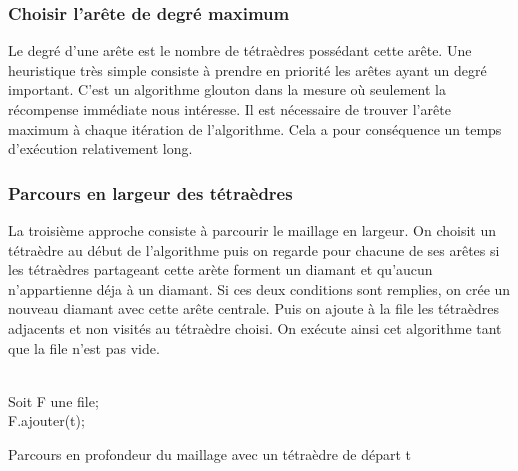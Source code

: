 \documentclass[a4paper,11pt,openany]{article}
\begin{document}
\subsubsection{Choisir l'arête de degré maximum}
\noindent
Le degré d'une arête est le nombre de tétraèdres possédant cette arête. Une heuristique très simple consiste à prendre en priorité les arêtes ayant un degré important. C'est un algorithme glouton dans la mesure où seulement la récompense immédiate nous intéresse. Il est nécessaire de trouver l'arête maximum à chaque itération de l'algorithme. Cela a pour conséquence un temps d'exécution relativement long.
\subsubsection{Parcours en largeur des tétraèdres}
\label{parcours_largeur}
\noindent
La troisième approche consiste à parcourir le maillage en largeur. On choisit un tétraèdre au début de l'algorithme puis on regarde pour chacune de ses arêtes si les tétraèdres partageant cette arète forment un diamant et qu'aucun n'appartienne déja à un diamant. Si ces deux conditions sont remplies, on crée un nouveau diamant avec cette arête centrale. Puis on ajoute à la file les tétraèdres adjacents et non visités au tétraèdre choisi. On exécute ainsi cet algorithme tant que la file n'est pas vide.\\\\
\begin{algorithm}[H]
\SetAlgoLined	
 Soit F une file;\\
 F.ajouter(t);\\
 \caption{Parcours en profondeur du maillage avec un tétraèdre de départ t}
\end{algorithm}
\end{document}
